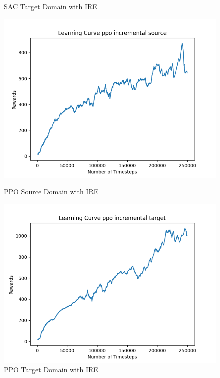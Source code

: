 \documentclass[11pt]{article}
\begin{document}
\begin{figure}[H]
\begin{minipage}{0.45\textwidth}
        \caption{SAC Target Domain with IRE}
        \label{fig:sac_target_ire}
    \end{minipage}
    \vfill
    \begin{minipage}{0.45\textwidth}
        \centering
        \includegraphics[width=\textwidth]{../images/Learning_Curve_PPO_Incremental_Source.png}
        \caption{PPO Source Domain with IRE}
        \label{fig:ppo_source_ire}
    \end{minipage}
    \hfill
    \begin{minipage}{0.45\textwidth}
        \centering
        \includegraphics[width=\textwidth]{../images/Learning_Curve_PPO_Incremental_Target.png}
        \caption{PPO Target Domain with IRE}
        \label{fig:ppo_target_ire}
    \end{minipage}
\end{figure}
\end{document}
